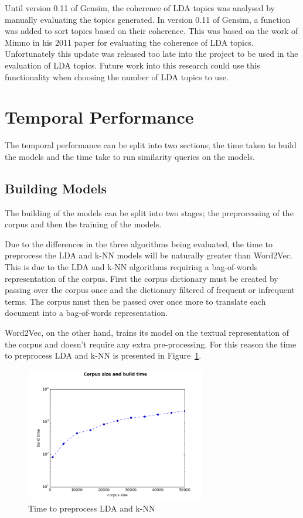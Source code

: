 Until version 0.11 of Gensim, the coherence of LDA topics was analysed by manually evaluating the topics generated.
In version 0.11 of Gensim, a function was added to sort topics based on their coherence.
This was based on the work of Mimno in his 2011 paper for evaluating the coherence of LDA topics\cite{Mimno}.
Unfortunately this update was released too late into the project to be used in the evaluation of LDA topics.
Future work into this research could use this functionality when choosing the number of LDA topics to use.

\section{Temporal Performance}
The temporal performance can be split into two sections; the time taken to build the models and the time take to run similarity queries on the models.

\subsection{Building Models}
The building of the models can be split into two stages;
the preprocessing of the corpus and then the training of the models.

Due to the differences in the three algorithms being evaluated, the time to preprocess the LDA and k-NN models will be naturally greater than Word2Vec.
This is due to the LDA and k-NN algorithms requiring a bag-of-words representation of the corpus.
First the corpus dictionary must be created by passing over the corpus once and the dictionary filtered of frequent or infrequent terms.
The corpus must then be passed over once more to translate each document into a bag-of-words representation.

Word2Vec, on the other hand, trains its model on the textual representation of the corpus and doesn't require any extra pre-processing.
For this reason the time to preprocess LDA and k-NN is presented in Figure~\ref{fig:BuildBow}.

\begin{figure}[h]
    \centering
        \includegraphics[width=0.7\textwidth]{Figures/BuildBOW.png}
    \caption{Time to preprocess LDA and k-NN}
    \label{fig:BuildBow}
\end{figure}

